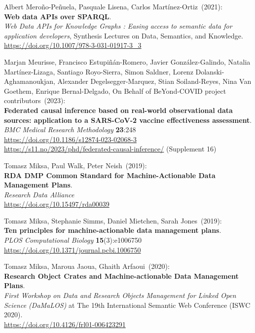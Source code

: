 \begin{thebibliography}{9}
Albert Meroño-Peñuela, Pasquale Lisena, Carlos Martínez-Ortiz~(2021): \\
\textbf{Web data APIs over {SPARQL}}. \\
\emph{Web Data APIs for Knowledge Graphs : Easing access to semantic data for application developers}, 
Synthesis Lectures on Data, Semantics, and Knowledge.\\
\url{https://doi.org/10.1007/978-3-031-01917-3_3}

Marjan Meurisse, Francisco Estupiñán-Romero, Javier González-Galindo, Natalia Martínez-Lizaga, Santiago Royo-Sierra, Simon Saldner, Lorenz Dolanski-Aghamanoukjan, Alexander Degelsegger-Marquez, Stian Soiland-Reyes, Nina Van Goethem, Enrique Bernal-Delgado, On Behalf of BeYond-COVID project contributors~(2023): \\
\textbf{Federated causal inference based on real-world observational data sources: application to a SARS-CoV-2 vaccine effectiveness assessment}.  \\
\emph{BMC Medical Research Methodology} \textbf{23}:248\\
\url{https://doi.org/10.1186/s12874-023-02068-3}\\
\url{https://s11.no/2023/phd/federated-causal-inference/}
(Supplement 16)

Tomasz Miksa, Paul Walk, Peter Neish~(2019): \\
\textbf{RDA DMP Common Standard for Machine-Actionable Data Management Plans}.\\
\emph{Research Data Alliance}\\
\url{https://doi.org/10.15497/rda00039}

Tomasz Miksa, Stephanie Simms, Daniel Mietchen, Sarah Jones~(2019): \\
\textbf{Ten principles for machine-actionable data management plans}.\\
\emph{PLOS Computational Biology} \textbf{15}(3):e1006750\\
\url{https://doi.org/10.1371/journal.pcbi.1006750}

Tomasz Miksa, Maroua Jaoua, Ghaith Arfaoui~(2020): \\
\textbf{Research Object Crates and Machine-actionable Data Management Plans}.\\
\emph{First Workshop on Data and Research Objects Management for Linked Open Science (DaMaLOS)} at The 19th International Semantic Web
Conference (ISWC 2020).\\
\url{https://doi.org/10.4126/frl01-006423291}


\end{thebibliography}
